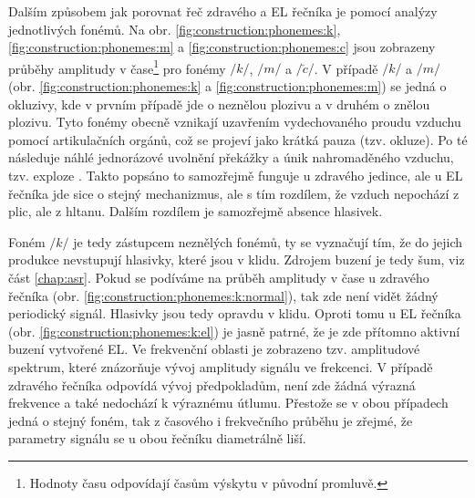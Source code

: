 Dalším způsobem jak porovnat řeč zdravého a EL řečníka je pomocí analýzy jednotlivých fonémů. Na obr. \ref{fig:construction:phonemes:k}, \ref{fig:construction:phonemes:m} a \ref{fig:construction:phonemes:c} jsou zobrazeny průběhy amplitudy v čase\footnote{Hodnoty času odpovídají časům výskytu v původní promluvě.} pro fonémy $/k/$, $/m/$ a $/\check{c}/$. V případě $/k/$ a $/m/$ (obr. \ref{fig:construction:phonemes:k} a \ref{fig:construction:phonemes:m}) se jedná o okluzivy, kde v prvním případě jde o neznělou plozivu a v druhém o znělou plozivu. Tyto fonémy obecně vznikají uzavřením vydechovaného proudu vzduchu pomocí artikulačních orgánů, což se projeví jako krátká pauza (tzv. okluze). Po té následuje náhlé jednorázové uvolnění překážky a únik nahromaděného vzduchu, tzv. exploze \cite{Psutka2006}. Takto popsáno to samozřejmě funguje u zdravého jedince, ale u EL řečníka jde sice o stejný mechanizmus, ale s tím rozdílem, že vzduch nepochází z plic, ale z hltanu. Dalším rozdílem je samozřejmě absence hlasivek.

Foném $/k/$ je tedy zástupcem neznělých fonémů, ty se vyznačují tím, že do jejich produkce nevstupují hlasivky, které jsou v klidu. Zdrojem buzení je tedy šum, viz část \ref{chap:asr}. Pokud se podíváme na průběh amplitudy v čase u zdravého řečníka (obr. \ref{fig:construction:phonemes:k:normal}), tak zde není vidět žádný periodický signál. Hlasivky jsou tedy opravdu v klidu. Oproti tomu u EL řečníka (obr. \ref{fig:construction:phonemes:k:el}) je jasně patrné, že je zde přítomno aktivní buzení vytvořené EL. Ve frekvenční oblasti je zobrazeno tzv. amplitudové spektrum, které znázorňuje vývoj amplitudy signálu ve frekcenci. V případě zdravého řečníka odpovídá vývoj předpokladům, není zde žádná výrazná frekvence a také nedochází k výraznému útlumu. Přestože se v obou případech jedná o stejný foném, tak z časového i frekvečního průběhu je zřejmé, že parametry signálu se u obou řečníku diametrálně liší.

